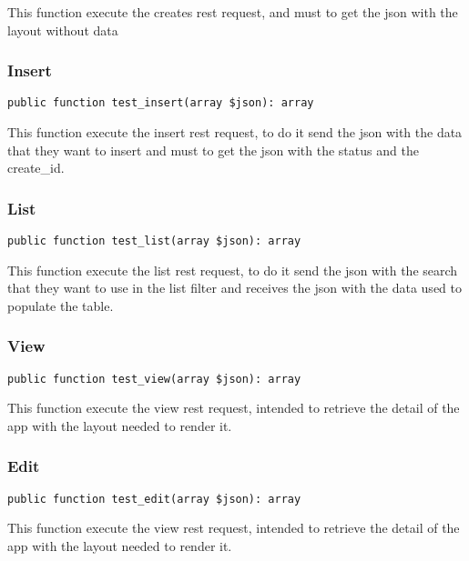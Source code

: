 \documentclass[a4paper]{article}
\begin{document}
This function execute the creates rest request, and must to get the
json with the layout without data

\hypertarget{toc71}{}
\subsubsection{Insert}

\begin{lstlisting}
public function test_insert(array $json): array
\end{lstlisting}

This function execute the insert rest request, to do it send the json with
the data that they want to insert and must to get the json with the status
and the create\_id.

\hypertarget{toc72}{}
\subsubsection{List}

\begin{lstlisting}
public function test_list(array $json): array
\end{lstlisting}

This function execute the list rest request, to do it send the json with
the search that they want to use in the list filter and receives the json
with the data used to populate the table.

\hypertarget{toc73}{}
\subsubsection{View}

\begin{lstlisting}
public function test_view(array $json): array
\end{lstlisting}

This function execute the view rest request, intended to retrieve the detail
of the app with the layout needed to render it.

\hypertarget{toc74}{}
\subsubsection{Edit}

\begin{lstlisting}
public function test_edit(array $json): array
\end{lstlisting}

This function execute the view rest request, intended to retrieve the detail
of the app with the layout needed to render it.
\end{document}
